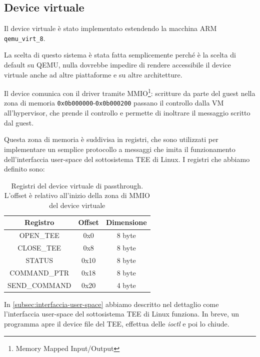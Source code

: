 \documentclass[12pt,italian]{report}
\begin{document}
\subsection{Device virtuale}
Il device virtuale è stato implementato estendendo la macchina ARM
\texttt{qemu\_virt\_8}. 

La scelta di questo sistema è stata fatta semplicemente perché è
la scelta di default su QEMU, nulla dovrebbe impedire di rendere
accessibile il device virtuale anche ad altre piattaforme e su altre
architetture.

\bigbreak \noindent

Il device comunica con il driver tramite MMIO\footnote{
    Memory Mapped Input/Output
}:
scritture da parte del guest nella zona di memoria
\texttt{0x0b000000}-\texttt{0x0b000200}
passano il controllo dalla VM all'hypervisor, che prende il controllo e
permette di inoltrare il messaggio scritto dal guest.

Questa zona di memoria è suddivisa in registri, che sono utilizzati
per implementare un semplice protocollo a messaggi che imita il funzionamento
dell'interfaccia user-space del sottosistema TEE di Linux.
I registri che abbiamo definito sono:

\begin{table}
    \centering
    \begin{tabular}{|c|c|c|}
        \hline
        \textbf{Registro}   & \textbf{Offset} & \textbf{Dimensione} \\
        \hline
        OPEN\_TEE           & 0x0             & 8 byte \\
        CLOSE\_TEE          & 0x8             & 8 byte \\
        STATUS              & 0x10            & 8 byte \\
        COMMAND\_PTR        & 0x18            & 8 byte \\
        SEND\_COMMAND       & 0x20            & 4 byte \\
        \hline
    \end{tabular}
    \caption{
        Registri del device virtuale di passthrough.
        L'offset è relativo all'inizio della zona di MMIO del device virtuale
    }
    \label{table:registri-device}
\end{table}

In \ref{subsec:interfaccia-user-space} abbiamo descritto nel dettaglio
come l'interfaccia user-space del sottosistema TEE di Linux funziona.
In breve, un programma apre il device file del TEE, effettua delle
\textit{ioctl} e poi lo chiude.
\end{document}
